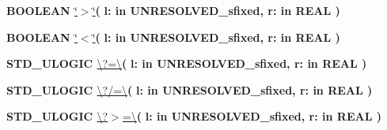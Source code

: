 \begin{DoxyCompactItemize}
\item 
{\bfseries {\bfseries \textcolor{comment}{B\+O\+O\+L\+E\+A\+N}\textcolor{vhdlchar}{ }}} \hyperlink{class__fixed__pkg_ac6c82329bf849852be997a3d0a737cf9}{\char`\"{}$>$\char`\"{}}{\bfseries  ( }{\bfseries \textcolor{vhdlchar}{l\+: }\textcolor{stringliteral}{in }\textcolor{vhdlchar}{U\+N\+R\+E\+S\+O\+L\+V\+E\+D\+\_\+sfixed}}{\bfseries  , \textcolor{vhdlchar}{r\+: }\textcolor{stringliteral}{in }{\bfseries \textcolor{comment}{R\+E\+A\+L}\textcolor{vhdlchar}{ }}}{\bfseries  )} 
\item 
{\bfseries {\bfseries \textcolor{comment}{B\+O\+O\+L\+E\+A\+N}\textcolor{vhdlchar}{ }}} \hyperlink{class__fixed__pkg_a5d059cf3277e3585e4f3f076db10b273}{\char`\"{}$<$\char`\"{}}{\bfseries  ( }{\bfseries \textcolor{vhdlchar}{l\+: }\textcolor{stringliteral}{in }\textcolor{vhdlchar}{U\+N\+R\+E\+S\+O\+L\+V\+E\+D\+\_\+sfixed}}{\bfseries  , \textcolor{vhdlchar}{r\+: }\textcolor{stringliteral}{in }{\bfseries \textcolor{comment}{R\+E\+A\+L}\textcolor{vhdlchar}{ }}}{\bfseries  )} 
\item 
{\bfseries {\bfseries \textcolor{comment}{S\+T\+D\+\_\+\+U\+L\+O\+G\+I\+C}\textcolor{vhdlchar}{ }}} \hyperlink{class__fixed__pkg_a69151531d87456d952c2073704fa1779}{\textbackslash{}?=\textbackslash{}}{\bfseries  ( }{\bfseries \textcolor{vhdlchar}{l\+: }\textcolor{stringliteral}{in }\textcolor{vhdlchar}{U\+N\+R\+E\+S\+O\+L\+V\+E\+D\+\_\+sfixed}}{\bfseries  , \textcolor{vhdlchar}{r\+: }\textcolor{stringliteral}{in }{\bfseries \textcolor{comment}{R\+E\+A\+L}\textcolor{vhdlchar}{ }}}{\bfseries  )} 
\item 
{\bfseries {\bfseries \textcolor{comment}{S\+T\+D\+\_\+\+U\+L\+O\+G\+I\+C}\textcolor{vhdlchar}{ }}} \hyperlink{class__fixed__pkg_a172a73302b09f0d298b93ecda8c5e976}{\textbackslash{}?/=\textbackslash{}}{\bfseries  ( }{\bfseries \textcolor{vhdlchar}{l\+: }\textcolor{stringliteral}{in }\textcolor{vhdlchar}{U\+N\+R\+E\+S\+O\+L\+V\+E\+D\+\_\+sfixed}}{\bfseries  , \textcolor{vhdlchar}{r\+: }\textcolor{stringliteral}{in }{\bfseries \textcolor{comment}{R\+E\+A\+L}\textcolor{vhdlchar}{ }}}{\bfseries  )} 
\item 
{\bfseries {\bfseries \textcolor{comment}{S\+T\+D\+\_\+\+U\+L\+O\+G\+I\+C}\textcolor{vhdlchar}{ }}} \hyperlink{class__fixed__pkg_a3adee8c12e5c0bb76fc3e1a493284a27}{\textbackslash{}?$>$=\textbackslash{}}{\bfseries  ( }{\bfseries \textcolor{vhdlchar}{l\+: }\textcolor{stringliteral}{in }\textcolor{vhdlchar}{U\+N\+R\+E\+S\+O\+L\+V\+E\+D\+\_\+sfixed}}{\bfseries  , \textcolor{vhdlchar}{r\+: }\textcolor{stringliteral}{in }{\bfseries \textcolor{comment}{R\+E\+A\+L}\textcolor{vhdlchar}{ }}}{\bfseries  )} 

\end{DoxyCompactItemize}
